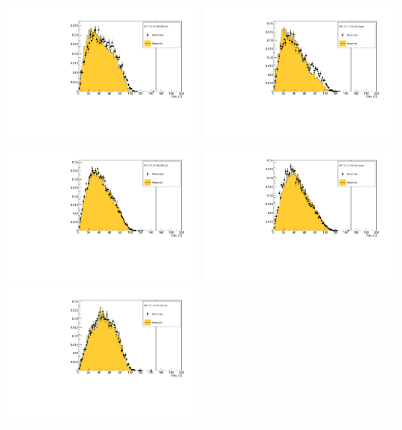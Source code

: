 \begin{figure}[!tbh]
    \centering
    \includegraphics*[width=0.45\textwidth]{02-Cuts/Figures/2017-2.7_3-140_lH2_full/tkd_max_r_ds_cut.pdf}
    \includegraphics*[width=0.45\textwidth]{02-Cuts/Figures/2017-2.7_3-140_lH2_empty/tkd_max_r_ds_cut.pdf}
    \includegraphics*[width=0.45\textwidth]{02-Cuts/Figures/2017-2.7_6-140_lH2_full/tkd_max_r_ds_cut.pdf}
    \includegraphics*[width=0.45\textwidth]{02-Cuts/Figures/2017-2.7_6-140_lH2_empty/tkd_max_r_ds_cut.pdf}
    \includegraphics*[width=0.45\textwidth]{02-Cuts/Figures/2017-2.7_10-140_lH2_full/tkd_max_r_ds_cut.pdf}

\end{figure}
